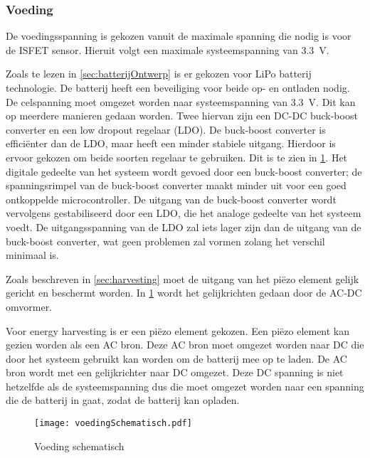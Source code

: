 \subsubsection{Voeding} \label{sec:voeding}

De voedingsspanning is gekozen vanuit de maximale spanning die nodig is voor de ISFET sensor\cite{isfet}. Hieruit volgt een maximale systeemspanning van \qty{3.3}{\volt}.


Zoals te lezen in \cref{sec:batterijOntwerp} is er gekozen voor LiPo batterij technologie. De batterij heeft een beveiliging voor beide op- en ontladen nodig. De celspanning moet omgezet worden naar systeemspanning van \qty{3.3}{\volt}. Dit kan op meerdere manieren gedaan worden. Twee hiervan zijn een DC-DC buck-boost converter en een low dropout regelaar (LDO). De buck-boost converter is efficiënter dan de LDO, maar heeft een minder stabiele uitgang. Hierdoor is ervoor gekozen om beide soorten regelaar te gebruiken. Dit is te zien in \cref{fig:voedingSchematisch}. Het digitale gedeelte van het systeem wordt gevoed door een buck-boost converter; de spanningsrimpel van de buck-boost converter maakt minder uit voor een goed ontkoppelde microcontroller.
De uitgang van de buck-boost converter wordt vervolgens gestabiliseerd door een LDO, die het analoge gedeelte van het systeem voedt. De uitgangsspanning van de LDO zal iets lager zijn dan de uitgang van de buck-boost converter, wat geen problemen zal vormen zolang het verschil minimaal is.

Zoals beschreven in \cref{sec:harvesting} moet de uitgang van het piëzo element gelijk gericht en beschermt worden. In \cref{fig:voedingSchematisch} wordt het gelijkrichten gedaan door de AC-DC omvormer.

Voor energy harvesting is er een piëzo element gekozen. Een piëzo element kan gezien worden als een AC bron. Deze AC bron moet omgezet worden naar DC die door het systeem gebruikt kan worden om de batterij mee op te laden. De AC bron wordt met een gelijkrichter naar DC omgezet. Deze DC spanning is niet hetzelfde als de systeemspanning dus die moet omgezet worden naar een spanning die de batterij in gaat, zodat de batterij kan opladen.

\begin{figure}[!htbp]
    \centering
    \texttt{[image: voedingSchematisch.pdf]}
    \caption{Voeding schematisch}
    \label{fig:voedingSchematisch}
\end{figure}



